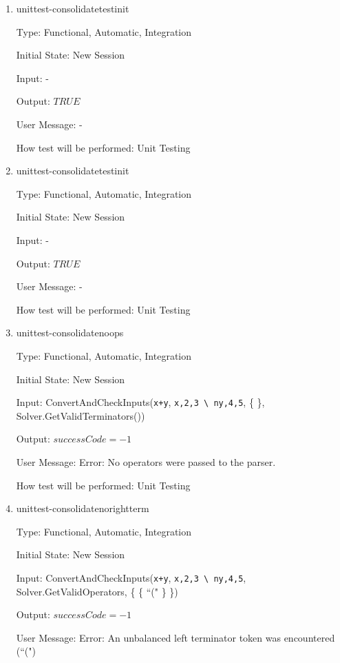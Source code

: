 \documentclass[12pt, titlepage]{article}
\begin{document}
\begin{enumerate}
	
	\item{unittest-consolidatetestinit}
	
	Type: Functional, Automatic, Integration
	
	Initial State: New Session
	
	Input: -
	
	Output: $TRUE$
	
	User Message: -
	
	How test will be performed: Unit Testing\\
	
	\item{unittest-consolidatetestinit}
	
	Type: Functional, Automatic, Integration
	
	Initial State: New Session
	
	Input: -
	
	Output: $TRUE$
	
	User Message: -
	
	How test will be performed: Unit Testing\\
	
	\item{unittest-consolidatenoops}
	
	Type: Functional, Automatic, Integration
	
	Initial State: New Session
	
	Input: ConvertAndCheckInputs(\texttt{x+y}, \texttt{x,2,3 \textbackslash 
		ny,4,5}, \{ \}, Solver.GetValidTerminators())
	
	Output: $successCode = -1$
	
	User Message: Error: No operators were passed to the parser.
	
	How test will be performed: Unit Testing\\
	
	\item{unittest-consolidatenorightterm}
	
	Type: Functional, Automatic, Integration
	
	Initial State: New Session
	
	Input: ConvertAndCheckInputs(\texttt{x+y}, \texttt{x,2,3 \textbackslash 
		ny,4,5}, Solver.GetValidOperators, \{ \{ ``(" \} \})
	
	Output: $successCode = -1$
	
	User Message: Error: An unbalanced left terminator token was encountered 
	(``(")
	

\end{enumerate}
\end{document}
